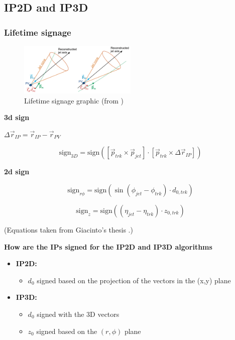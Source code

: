 \subsection{IP2D and IP3D}

\subsubsection{Lifetime signage}

\begin{figure}[htbp]
  \centering
 \includegraphics[width=0.5\textwidth]{figures/ftag/lifetime-signage}
 \caption{Lifetime signage graphic (from \cite{giacinto-thesis})}
 \label{fig:lifetime-signage}
\end{figure}


\textbf{3d sign}

$\Delta \vec{r}_{IP} = \vec{r}_{IP}  - \vec{r}_{PV} $

\begin{equation}
  \text{sign}_{3D} =   \text{sign} \left( \left[ \vec{p}_{trk} \times \vec{p}_{jet} \right] \cdot \left[   \vec{p}_{trk} \times \Delta \vec{r}_{IP} \right] \right)
\end{equation}

\textbf{2d sign}

\begin{equation}
  \text{sign}_{r \phi} =   \text{sign} \left( \sin \left( \phi_{jet} - \phi_{trk} \right) \cdot d_{0,trk} \right)
\end{equation}

\begin{equation}
  \text{sign}_{z} =   \text{sign} \left(  \left(  \eta_{jet} - \eta_{trk} \right) \cdot z_{0,trk}  \right)
\end{equation}



(Equations taken from Giacinto's thesis  \cite{giacinto-thesis}.)

\textbf{How are the IPs signed for the IP2D and IP3D algorithms}

\begin{itemize}
	\item \textbf{IP2D: }
	\begin{itemize}
	\item$d_0$ signed based on the projection of the vectors in the (x,y) plane
	\end{itemize}

	\item \textbf{IP3D:}
	\begin{itemize}
	\item $d_0$ signed with the 3D vectors
	\item $z_0$ signed based on the $(r, \phi)$ plane
\end{itemize}
\end{itemize}

